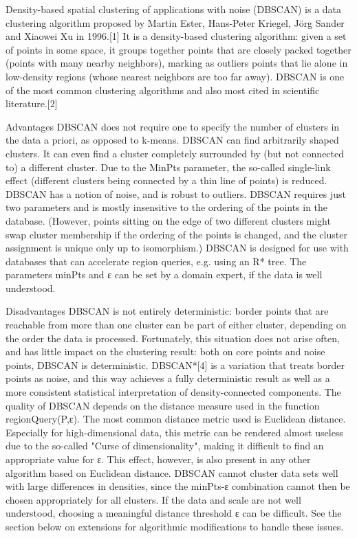 Density-based spatial clustering of applications with noise (DBSCAN) is a data clustering algorithm proposed by Martin Ester, Hans-Peter Kriegel, Jörg Sander and Xiaowei Xu in 1996.[1] It is a density-based clustering algorithm: given a set of points in some space, it groups together points that are closely packed together (points with many nearby neighbors), marking as outliers points that lie alone in low-density regions (whose nearest neighbors are too far away). 
DBSCAN is one of the most common clustering algorithms and also most cited in scientific literature.[2]


Advantages
DBSCAN does not require one to specify the number of clusters in the data a priori, as opposed to k-means.
DBSCAN can find arbitrarily shaped clusters. It can even find a cluster completely surrounded by (but not connected to) a different cluster. Due to the MinPts parameter, the so-called single-link effect (different clusters being connected by a thin line of points) is reduced.
DBSCAN has a notion of noise, and is robust to outliers.
DBSCAN requires just two parameters and is mostly insensitive to the ordering of the points in the database. (However, points sitting on the edge of two different clusters might swap cluster membership if the ordering of the points is changed, and the cluster assignment is unique only up to isomorphism.)
DBSCAN is designed for use with databases that can accelerate region queries, e.g. using an R* tree.
The parameters minPts and ε can be set by a domain expert, if the data is well understood.

Disadvantages
DBSCAN is not entirely deterministic: border points that are reachable from more than one cluster can be part of either cluster, depending on the order the data is processed. Fortunately, this situation does not arise often, and has little impact on the clustering result: both on core points and noise points, DBSCAN is deterministic. DBSCAN*[4] is a variation that treats border points as noise, and this way achieves a fully deterministic result as well as a more consistent statistical interpretation of density-connected components.
The quality of DBSCAN depends on the distance measure used in the function regionQuery(P,ε). The most common distance metric used is Euclidean distance. Especially for high-dimensional data, this metric can be rendered almost useless due to the so-called "Curse of dimensionality", making it difficult to find an appropriate value for ε. This effect, however, is also present in any other algorithm based on Euclidean distance.
DBSCAN cannot cluster data sets well with large differences in densities, since the minPts-ε combination cannot then be chosen appropriately for all clusters.
If the data and scale are not well understood, choosing a meaningful distance threshold ε can be difficult.
See the section below on extensions for algorithmic modifications to handle these issues.
